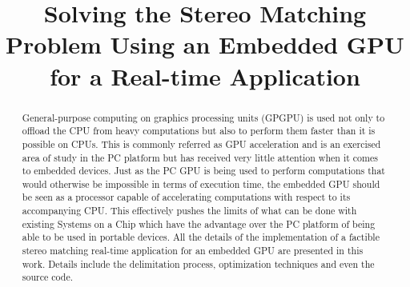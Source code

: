 \documentclass[conference]{IEEEtran}
\begin{document}
\title{Solving the Stereo Matching Problem Using an Embedded GPU for a Real-time Application}

\author{


}

\maketitle

\begin{abstract}
General-purpose computing on graphics processing units (GPGPU) is used not only to offload the CPU from heavy computations but also to perform them faster than it is possible on CPUs. This is commonly referred as GPU acceleration and is an exercised area of study in the PC platform but has received very little attention when it comes to embedded devices. Just as the PC GPU is being used to perform computations that would otherwise be impossible in terms of execution time, the embedded GPU should be seen as a processor capable of accelerating computations with respect to its accompanying CPU. This effectively pushes the limits of what can be done with existing Systems on a Chip which have the advantage over the PC platform of being able to be used in portable devices. All the details of the implementation of a factible stereo matching real-time application for an embedded GPU are presented in this work. Details include the delimitation process, optimization techniques and even the source code.
\end{abstract}


\IEEEpeerreviewmaketitle

\end{document}
